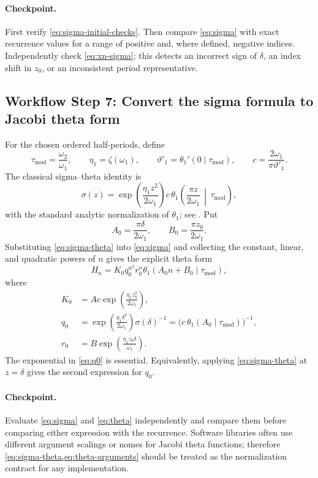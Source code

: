 \documentclass[11pt]{article}
\newcommand{\workflowstep}[1]{\subsection{Workflow Step #1}}
\newcommand{\taumod}{\tau_{\mathrm{mod}}}
\begin{document}
\paragraph{Checkpoint.}
First verify \cref{eq:sigma-initial-checks}. Then compare
\cref{eq:sigma} with exact recurrence values for a range of positive and,
where defined, negative indices. Independently check \cref{eq:xn-sigma}; this
detects an incorrect sign of $\delta$, an index shift in $z_0$, or an
inconsistent period representative.

\workflowstep{7: Convert the sigma formula to Jacobi theta form}
For the chosen ordered half-periods, define
\[
  \taumod=\frac{\omega_2}{\omega_1},
  \qquad
  \eta_1=\zeta(\omega_1),
  \qquad
  \vartheta'_1=\theta_1'(0\mid\taumod),
  \qquad
  c=\frac{2\omega_1}{\pi\vartheta'_1}.
\]
The classical sigma--theta identity is
\begin{equation}
 \sigma(z)=
 \exp\!\left(\frac{\eta_1z^2}{2\omega_1}\right)
 c\,
 \theta_1\!\left(\frac{\pi z}{2\omega_1}\,\middle|\,\taumod\right),
 \label{eq:sigma-theta}
\end{equation}
with the standard analytic normalization of $\theta_1$; see
\cite{WhittakerWatson,DLMF23}. Put
\begin{equation}
  A_0=\frac{\pi\delta}{2\omega_1},
  \qquad
  B_0=\frac{\pi z_0}{2\omega_1}.
  \label{eq:theta-arguments}
\end{equation}
Substituting \cref{eq:sigma-theta} into \cref{eq:sigma} and collecting the
constant, linear, and quadratic powers of $n$ gives the explicit theta form
\begin{equation}
  H_n=K_0q_0^{n^2}r_0^n
  \theta_1(A_0n+B_0\mid\taumod),
  \label{eq:theta}
\end{equation}
where
\begin{align}
  K_0&=Ac\exp\!\left(\frac{\eta_1z_0^2}{2\omega_1}\right),
  \label{eq:K0}\\
  q_0&=\exp\!\left(\frac{\eta_1\delta^2}{2\omega_1}\right)\sigma(\delta)^{-1}
       =\bigl(c\,\theta_1(A_0\mid\taumod)\bigr)^{-1},
  \label{eq:q0}\\
  r_0&=B\exp\!\left(\frac{\eta_1z_0\delta}{\omega_1}\right).
  \label{eq:r0}
\end{align}
The exponential in \cref{eq:q0} is essential. Equivalently, applying
\cref{eq:sigma-theta} at $z=\delta$ gives the second expression for $q_0$.

\paragraph{Checkpoint.}
Evaluate \cref{eq:sigma} and \cref{eq:theta} independently and compare them
before comparing either expression with the recurrence. Software libraries
often use different argument scalings or nomes for Jacobi theta functions;
therefore \cref{eq:sigma-theta,eq:theta-arguments} should be treated as the
normalization contract for any implementation.
\end{document}
